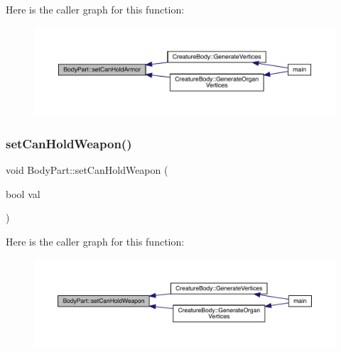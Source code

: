 Here is the caller graph for this function\+:
\nopagebreak
\begin{figure}[H]
\begin{center}
\leavevmode
\includegraphics[width=350pt]{d2/d6f/class_body_part_ad83118e7510cbab332815cd9254a6024_icgraph}
\end{center}
\end{figure}
\mbox{\label{class_body_part_af61f39aa545dacd8c1a9cf43761df85a}} 
\subsubsection{\texorpdfstring{set\+Can\+Hold\+Weapon()}{setCanHoldWeapon()}}
{\footnotesize\ttfamily void Body\+Part\+::set\+Can\+Hold\+Weapon (\begin{DoxyParamCaption}\item[{bool}]{val }\end{DoxyParamCaption})}

Here is the caller graph for this function\+:
\nopagebreak
\begin{figure}[H]
\begin{center}
\leavevmode
\includegraphics[width=350pt]{d2/d6f/class_body_part_af61f39aa545dacd8c1a9cf43761df85a_icgraph}
\end{center}
\end{figure}
\mbox{\label{class_body_part_acb68020a45ea6f0d14b963b3159317a2}} 
